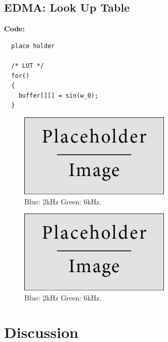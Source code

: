 \documentclass{article}
\begin{document}
\subsection{EDMA: Look Up Table}

\textbf{Code:}

\begin{verbatim}
  place holder

  /* LUT */
  for()
  {
    buffer[][] = sin(w_0);
  }
\end{verbatim}

\begin{figure}[h]
  \begin{center}
    \includegraphics[width=0.65\textwidth]{img/placeholder.jpg}
    \caption{Blue: 2kHz Green: 6kHz.}
  \end{center}
\end{figure}

\begin{figure}[h]
  \begin{center}
    \includegraphics[width=0.65\textwidth]{img/placeholder.jpg}
    \caption{Blue: 2kHz Green: 6kHz.}
  \end{center}
\end{figure}


\section{Discussion}
\end{document}
